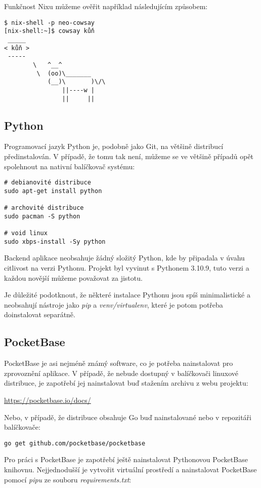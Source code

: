 \documentclass[11pt,a4paper,twoside,openright]{report}
\begin{document}
Funkčnost Nixu můžeme ověřit například následujícím způsobem:

\begin{verbatim}
$ nix-shell -p neo-cowsay
[nix-shell:~]$ cowsay kůň
 _____
< kůň >
 -----
        \   ^__^
         \  (oo)\_______
            (__)\       )\/\
                ||----w |
                ||     ||
\end{verbatim}

\subsection{Python}
Programovací jazyk Python je, podobně jako Git, na většině distribucí předinstalován. V případě,
že tomu tak není, můžeme se ve většině případů opět spolehnout na nativní balíčkovač systému: 

\begin{verbatim}
# debianovité distribuce
sudo apt-get install python

# archovité distribuce
sudo pacman -S python

# void linux
sudo xbps-install -Sy python
\end{verbatim}

Backend aplikace neobsahuje žádný složitý Python, kde by připadala v úvahu citlivost na verzi Pythonu.
Projekt byl vyvinut s Pythonem 3.10.9, tuto verzi a každou novější můžeme považovat za jistotu.

Je důležité podotknout, že některé instalace Pythonu jsou spíš minimalistické a neobsahují nástroje
jako \emph{pip} a \emph{venv/virtualenv}, které je potom potřeba doinstalovat separátně.

\subsection{PocketBase}
PocketBase je asi nejméně známý software, co je potřeba nainstalovat pro zprovoznění aplikace.
V případě, že nebude dostupný v balíčkovači linuxové distribuce, je zapotřebí jej nainstalovat
buď stažením archivu z webu projektu:

\url{https://pocketbase.io/docs/}

Nebo, v případě, že distribuce obsahuje Go buď nainstalované nebo v repozitáři balíčkovače:

\begin{verbatim}
go get github.com/pocketbase/pocketbase
\end{verbatim}

Pro práci s PocketBase je zapotřebí ještě nainstalovat Pythonovou PocketBase knihovnu.
Nejjednodušší je vytvořit virtuální prostředí a nainstalovat PocketBase pomocí \emph{pipu}
ze souboru \emph{requirements.txt}:
\end{document}
